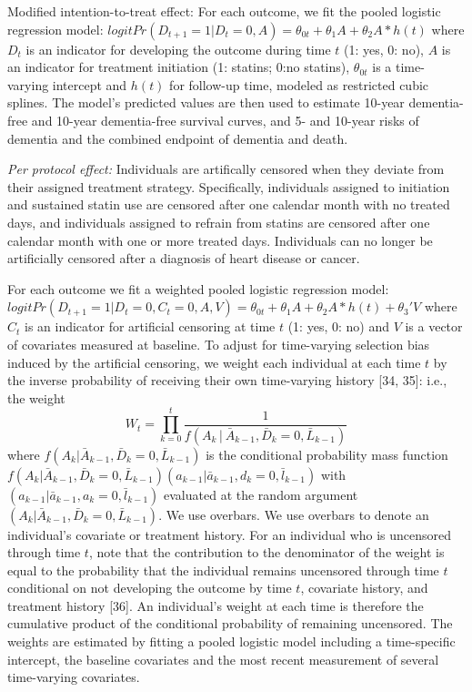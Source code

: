 \documentclass[
]{book}
\begin{document}
Modified intention-to-treat effect: For each outcome, we fit the pooled logistic regression model: \(logitPr(D_{t+1} = 1|D_t = 0, A) = \theta_{0t} + \theta_{1}A + \theta_{2}A * h(t)\) where \(D_t\) is an indicator for developing the outcome during time \(t\) (1: yes, 0: no), \(A\) is an indicator for treatment initiation (1: statins; 0:no statins), \(\theta_{0t}\) is a time-varying intercept and \(h(t)\) for follow-up time, modeled as restricted cubic splines. The model's predicted values are then used to estimate 10-year dementia-free and 10-year dementia-free survival curves, and 5- and 10-year risks of dementia and the combined endpoint of dementia and death.

\emph{Per protocol effect:} Individuals are artifically censored when they deviate from their assigned treatment strategy. Specifically, individuals assigned to initiation and sustained statin use are censored after one calendar month with no treated days, and individuals assigned to refrain from statins are censored after one calendar month with one or more treated days. Individuals can no longer be artificially censored after a diagnosis of heart disease or cancer.

For each outcome we fit a weighted pooled logistic regression model: \(logitPr(D_{t+1} = 1|D_t = 0, C_t = 0, A, V) = \theta_{0t} + \theta_{1}A + \theta_{2}A * h(t) + \theta_{3}'V\) where \(C_t\) is an indicator for artificial censoring at time \(t\) (1: yes, 0: no) and \(V\) is a vector of covariates measured at baseline. To adjust for time-varying selection bias induced by the artificial censoring, we weight each individual at each time \(t\) by the inverse probability of receiving their own time-varying history {[}34, 35{]}: i.e., the weight \[W_{t} = \prod_{k=0}^{t} \frac{1}{f(A_{k}│\bar{A}_{k-1}, \bar{D}_{k} = 0, \bar{L}_{k-1})}\] where \(f(A_{k}|\bar{A}_{k-1},\bar{D}_{k} = 0, \bar{L}_{k-1})\) is the conditional probability mass function \(f(A_{k}|\bar{A}_{k-1},\bar{D}_{k} = 0, \bar{L}_{k-1})(a_{k-1}|\bar{a}_{k-1}, d_k = 0, \bar{l}_{k-1})\) with \((a_{k-1}|\bar{a}_{k-1}, a_k = 0, \bar{l}_{k-1})\) evaluated at the random argument \((A_{k}|\bar{A}_{k-1},\bar{D}_{k} = 0, \bar{L}_{k-1})\). We use overbars. We use overbars to denote an individual's covariate or treatment history. For an individual who is uncensored through time \(t\), note that the contribution to the denominator of the weight is equal to the probability that the individual remains uncensored through time \(t\) conditional on not developing the outcome by time \(t\), covariate history, and treatment history {[}36{]}. An individual's weight at each time is therefore the cumulative product of the conditional probability of remaining uncensored. The weights are estimated by fitting a pooled logistic model including a time-specific intercept, the baseline covariates and the most recent measurement of several time-varying covariates.
\end{document}
